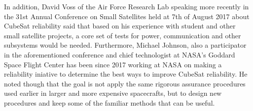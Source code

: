 \documentclass[english,12pt,a4paper,pdftex,elec,utf8]{aaltothesis}
\begin{document}
In addition, David Voss of the Air Force Research Lab speaking more recently in the 31st Annual Conference on Small Satellites held at 7th of August 2017 about CubeSat reliability said that based on his experience with student and other small satellite projects, a core set of tests for power, communication and other subsystems would be needed. Furthermore, Michael Johnson, also a participator in the aforementioned conference and chief technologist at NASA's Goddard Space Flight Center has been since 2017 working at NASA on making a reliability iniative to determine the best ways to improve CubeSat reliability. He noted though that the goal is not apply the same rigorous assurance procedures used earlier in larger and more expensive spacecrafts, but to design new procedures and keep some of the familiar methods that can be useful. \cite{smallsatconf31, ssvi} \par 
\end{document}
